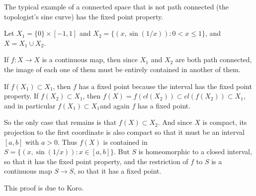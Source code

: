 \documentclass[12pt]{article}
\begin{document}
The typical example of a connected space that is not path connected (the topologist's sine curve) has the fixed point property.

Let $X_1 = \{0\} \times [-1,1]$ and $X_2 = \{(x,\sin(1/x)) : 0<x \le 1\}$, and $X = X_1 \cup X_2$.

If $f:X \to X$ is a continuous map, then since $X_1$ and $X_2$ are both path connected, the image of each one of them must be entirely contained in another of them.

If $f(X_1)\subset X_1$, then $f$ has a fixed point because the interval has the fixed point property.
If $f(X_2) \subset X_1$, then $f(X) = f(cl(X_2)) \subset cl(f(X_2)) \subset X_1$, and in particular 
$f(X_1) \subset X_1 $and again $f$ has a fixed point.

So the only case that remains is that $f(X)\subset X_2$. And since $X$ is compact, its projection to the first coordinate is also compact so that it must be an interval $[a,b]$ with $a>0$. Thus $f(X)$ is contained in 
$S = \{(x, \sin (1/x)) : x\in [a,b]\}$. But $S$ is homeomorphic to a closed interval, so that it has the fixed point property, and 
the restriction of $f$ to $S$ is a continuous map $S \to S$, so that it has a fixed point.

This proof is due to Koro.

\end{document}
